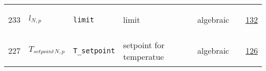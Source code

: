 \begin{longtable}{|p{1cm}|p{2.5cm}|p{4.5cm}|p{8cm}|p{3.0cm}|p{3cm}|p{1cm}|}
            233
             & \hypertarget{"v:233"}{ $ {l}{_{N, p}} $}
             & \verb|limit|
             & limit
             & \begin{lay}algebraic \end{lay}
             & $  $
             &                 \hyperlink{"e:132"}{ 132 }
                 \\
            227
             & \hypertarget{"v:227"}{ $ {{T_{setpoint}}}{_{N, p}} $}
             & \verb|T_setpoint|
             & setpoint for temperatue
             & \begin{lay}algebraic \end{lay}
             & $  $
             &                 \hyperlink{"e:126"}{ 126 }
                 \\
    \end{longtable}